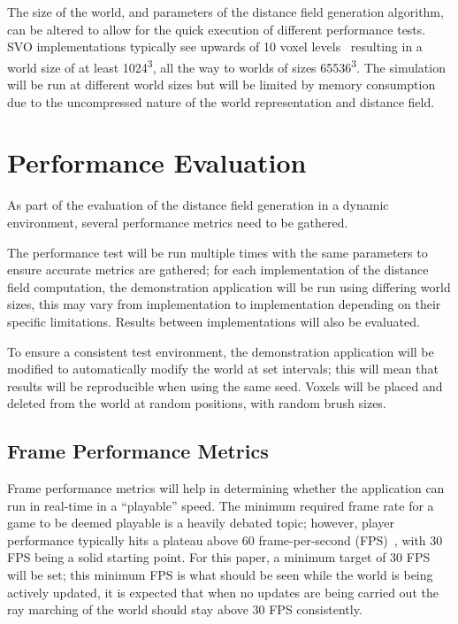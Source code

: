 The size of the world, and parameters of the distance field generation algorithm, can be altered to allow for the quick
execution of different performance tests. SVO implementations typically see upwards of 10 voxel
levels~\cite{laine2010efficient} resulting in a world size of at least 1024\textsuperscript{3}, all the way to worlds of
sizes 65536\textsuperscript{3}. The simulation will be run at different world sizes but will be limited by memory
consumption due to the uncompressed nature of the world representation and distance field.

\section{Performance Evaluation}\label{sec:perf_eval}
As part of the evaluation of the distance field generation in a dynamic environment, several performance metrics need to
be gathered.

The performance test will be run multiple times with the same parameters to ensure accurate metrics are gathered; for
each implementation of the distance field computation, the demonstration application will be run using differing world
sizes, this may vary from implementation to implementation depending on their specific limitations. Results between
implementations will also be evaluated.

To ensure a consistent test environment, the demonstration application will be modified to automatically modify the
world at set intervals; this will mean that results will be reproducible when using the same seed. Voxels will be placed
and deleted from the world at random positions, with random brush sizes.

\subsection{Frame Performance Metrics}\label{sec:frame_perf_metrics}
Frame performance metrics will help in determining whether the application can run in real-time in a ``playable'' speed.
The minimum required frame rate for a game to be deemed playable is a heavily debated topic; however, player performance
typically hits a plateau above 60 frame-per-second (FPS)~\cite{claypool2007frame}, with 30 FPS being a solid starting
point. For this paper, a minimum target of 30 FPS will be set; this minimum FPS is what should be seen while the world
is being actively updated, it is expected that when no updates are being carried out the ray marching of the world should
stay above 30 FPS consistently.


